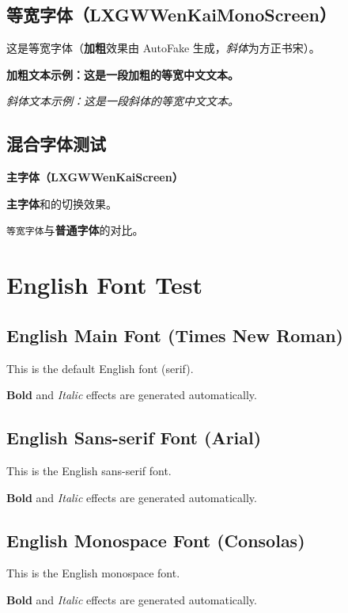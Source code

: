 \documentclass[fontset=none]{ctexart}
\begin{document}
\subsection{等宽字体（LXGWWenKaiMonoScreen）}
{\ttfamily
这是等宽字体（\textbf{加粗}效果由 AutoFake 生成，\textit{斜体}为方正书宋）。  
\par
\textbf{加粗文本示例：这是一段加粗的等宽中文文本。}
\par
\textit{斜体文本示例：这是一段斜体的等宽中文文本。}
}

\subsection{混合字体测试}
{
\textbf{主字体（LXGWWenKaiScreen）}
\par
{}
\par
{}
\par
\textbf{主字体}和的切换效果。  
\par
\texttt{等宽字体}与\textbf{普通字体}的对比。 
}

\section{English Font Test}

\subsection{English Main Font (Times New Roman)}
This is the default English font (serif).  
\par
\textbf{Bold} and \textit{Italic} effects are generated automatically.  

\subsection{English Sans-serif Font (Arial)}
{\sffamily
This is the English sans-serif font.  
\par
\textbf{Bold} and \textit{Italic} effects are generated automatically.  
}

\subsection{English Monospace Font (Consolas)}
{\ttfamily
This is the English monospace font.  
\par
\textbf{Bold} and \textit{Italic} effects are generated automatically.  
}
\end{document}
